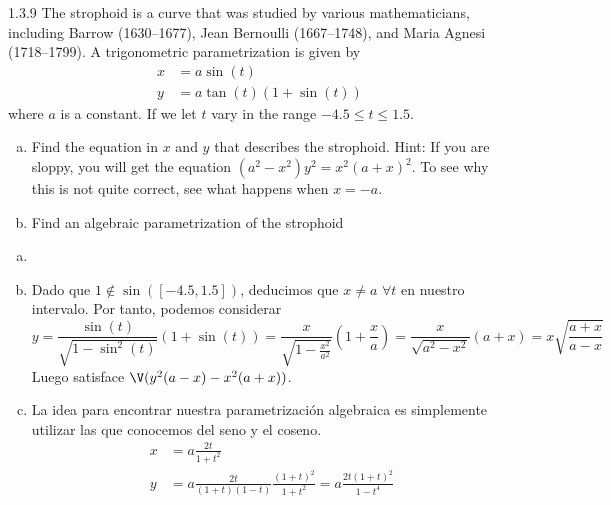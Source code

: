 \documentclass[twoside]{article}
\begin{document}
\newpage

\begin{ejercicio}{1.3.9}
The strophoid is a curve that was studied by various mathematicians, including Barrow (1630–1677), Jean Bernoulli (1667–1748), and Maria Agnesi (1718–1799). A trigonometric parametrization is given by
\begin{align*}
x&=a\sin(t)\\
y&=a\tan(t)(1+\sin(t))
\end{align*}
where $a$ is a constant. If we let $t$ vary in the range $−4.5 ≤ t ≤ 1.5$.
\begin{enumerate}[a.]
\item Find the equation in $x$ and $y$ that describes the strophoid. Hint: If you are sloppy, you will get the equation $(a^2 − x^2)y^2 = x^2(a + x)^2$. To see why this is not quite correct, see what happens when $x = −a$.
\item Find an algebraic parametrization of the strophoid
\end{enumerate}
\end{ejercicio}
\begin{solucion}
\begin{enumerate}[a.]
\item[]
\item Dado que $1\notin \sin([-4.5,1.5])$, deducimos que $x\neq a$ $\forall t$ en nuestro intervalo. Por tanto, podemos considerar
$$
y=\frac{\sin(t)}{\sqrt{1-\sin^2(t)}}(1+\sin(t)) =\frac{x}{\sqrt{1-\frac{x^2}{a^2}}}\left(1+\frac{x}{a}\right)=\frac{x}{\sqrt{a^2-{x^2}}}(a+x) = x\sqrt{\frac{a+x}{a-x}}
$$
Luego satisface $\V(y^2(a-x)-x^2(a+x))$. 
\item La idea para encontrar nuestra parametrización algebraica es simplemente utilizar las que conocemos del seno y el coseno.
\begin{align*}
x&=a\frac{2t}{1+t^2}\\
y&=a\frac{2t}{(1+t)(1-t)}\frac{(1+t)^2}{1+t^2} = a\frac{2t(1+t)^2}{1-t^4}
\end{align*}
\end{enumerate}
\end{solucion}
\newpage
\end{document}
